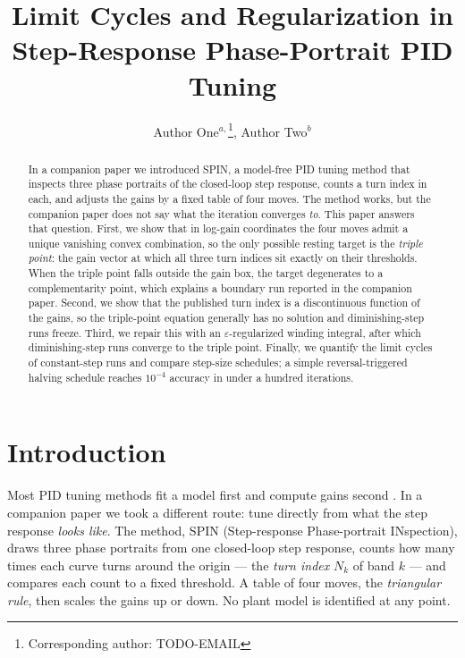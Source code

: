 \documentclass[twocolumn]{ifacconf}
\title{Limit Cycles and Regularization in Step-Response Phase-Portrait PID Tuning}
\author{Author One$^{a,}$\thanks{Corresponding author: TODO-EMAIL}, 
        Author Two$^b$}
\begin{document}
\maketitle

\begin{abstract}
In a companion paper we introduced SPIN, a model-free PID tuning method
that inspects three phase portraits of the closed-loop step response,
counts a turn index in each, and adjusts the gains by a fixed table of
four moves. The method works, but the companion paper does not say what
the iteration converges \emph{to}. This paper answers that question.
First, we show that in log-gain coordinates the four moves admit a unique
vanishing convex combination, so the only possible resting target is the
\emph{triple point}: the gain vector at which all three turn indices sit
exactly on their thresholds. When the triple point falls outside the gain
box, the target degenerates to a complementarity point, which explains a
boundary run reported in the companion paper. Second, we show that the
published turn index is a discontinuous function of the gains, so the
triple-point equation generally has no solution and diminishing-step runs
freeze. Third, we repair this with an $\varepsilon$-regularized winding
integral, after which diminishing-step runs converge to the triple point.
Finally, we quantify the limit cycles of constant-step runs and compare
step-size schedules; a simple reversal-triggered halving schedule reaches
$10^{-4}$ accuracy in under a hundred iterations.
\end{abstract}


\section{Introduction}
\label{sec:intro}

Most PID tuning methods fit a model first and compute gains second
\cite{ZN1942,AstromHagglund2004}. In a companion paper \cite{Paper1} we took
a different route: tune directly from what the step response \emph{looks like}.
The method, SPIN (Step-response Phase-portrait INspection), draws three phase
portraits from one closed-loop step response, counts how many times each curve
turns around the origin --- the \emph{turn index} $N_k$ of band $k$ --- and
compares each count to a fixed threshold. A table of four moves, the
\emph{triangular rule}, then scales the gains up or down. No plant model is
identified at any point.
\end{document}
